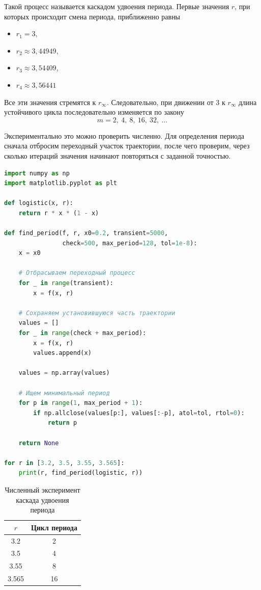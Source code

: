 \documentclass[14pt,a4paper]{extarticle}
\begin{document}
Такой процесс называется каскадом удвоения периода. Первые значения $r$, при которых происходит смена периода, приближенно равны
\begin{itemize}
    \item $r_1 = 3$,
    \item $r_2 \approx 3,44949$,
    \item $r_3 \approx 3,54409$,
    \item $r_4 \approx 3,56441$
\end{itemize}
Все эти значения стремятся к $r_{\infty}$. Следовательно, при движении от $3$ к $r_{\infty}$ длина устойчивого цикла последовательно изменяется по закону
\[
m = 2,\ 4,\ 8,\ 16,\ 32,\ ...
\]

Экспериментально это можно проверить численно. Для определения периода сначала отбросим переходный участок траектории, после чего проверим, через сколько итераций значения начинают повторяться с заданной точностью.

\begin{lstlisting}[language=python]
import numpy as np
import matplotlib.pyplot as plt

def logistic(x, r):
    return r * x * (1 - x)

def find_period(f, r, x0=0.2, transient=5000,
                check=500, max_period=128, tol=1e-8):
    x = x0

    # Отбрасываем переходный процесс
    for _ in range(transient):
        x = f(x, r)

    # Сохраняем установившуюся часть траектории
    values = []
    for _ in range(check + max_period):
        x = f(x, r)
        values.append(x)

    values = np.array(values)

    # Ищем минимальный период
    for p in range(1, max_period + 1):
        if np.allclose(values[p:], values[:-p], atol=tol, rtol=0):
            return p

    return None
    
for r in [3.2, 3.5, 3.55, 3.565]:
    print(r, find_period(logistic, r))
\end{lstlisting}

\begin{table}[H]
\centering
\caption{Численный эксперимент каскада удвоения периода}
\begin{tabular}{|c|c|}
\hline
$r$ & Цикл периода \\
\hline
3.2   & 2  \\
3.5   & 4  \\
3.55  & 8  \\
3.565 & 16 \\
\hline
\end{tabular}
\end{table}
\end{document}
